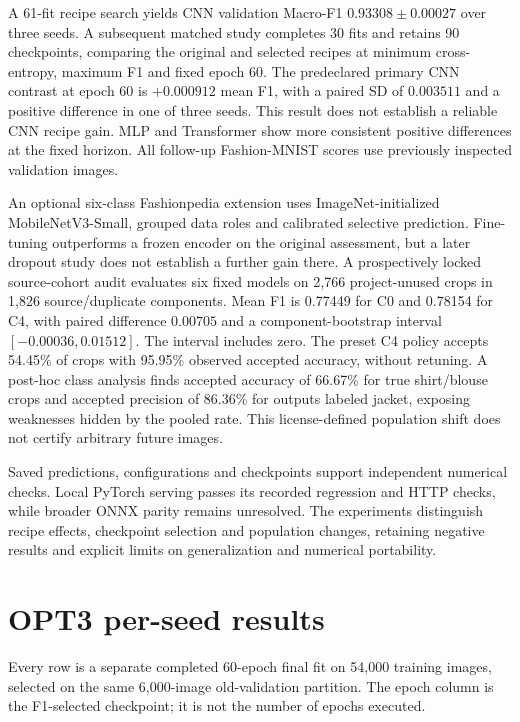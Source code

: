 A 61-fit recipe search yields CNN validation Macro-F1 $0.93308\pm0.00027$ over three seeds. A subsequent matched study completes 30 fits and retains 90 checkpoints, comparing the original and selected recipes at minimum cross-entropy, maximum F1 and fixed epoch 60. The predeclared primary CNN contrast at epoch 60 is $+0.000912$ mean F1, with a paired SD of $0.003511$ and a positive difference in one of three seeds. This result does not establish a reliable CNN recipe gain. MLP and Transformer show more consistent positive differences at the fixed horizon. All follow-up Fashion-MNIST scores use previously inspected validation images.

An optional six-class Fashionpedia extension uses ImageNet-initialized MobileNetV3-Small, grouped data roles and calibrated selective prediction. Fine-tuning outperforms a frozen encoder on the original assessment, but a later dropout study does not establish a further gain there. A prospectively locked source-cohort audit evaluates six fixed models on 2,766 project-unused crops in 1,826 source/duplicate components. Mean F1 is 0.77449 for C0 and 0.78154 for C4, with paired difference $0.00705$ and a component-bootstrap interval $[-0.00036,0.01512]$. The interval includes zero. The preset C4 policy accepts 54.45\% of crops with 95.95\% observed accepted accuracy, without retuning. A post-hoc class analysis finds accepted accuracy of 66.67\% for true shirt/blouse crops and accepted precision of 86.36\% for outputs labeled jacket, exposing weaknesses hidden by the pooled rate. This license-defined population shift does not certify arbitrary future images.

Saved predictions, configurations and checkpoints support independent numerical checks. Local PyTorch serving passes its recorded regression and HTTP checks, while broader ONNX parity remains unresolved. The experiments distinguish recipe effects, checkpoint selection and population changes, retaining negative results and explicit limits on generalization and numerical portability.

\clearpage
\begingroup\small\setlength{\parskip}{0pt}
\makeatletter{}\makeatother
\tableofcontents
\endgroup
\clearpage
{}

\clearpage

\clearpage

\clearpage
\appendix
\section{OPT3 per-seed results}\label{app:seeds}
Every row is a separate completed 60-epoch final fit on 54,000 training images, selected on the same 6,000-image old-validation partition. The epoch column is the F1-selected checkpoint; it is not the number of epochs executed.

